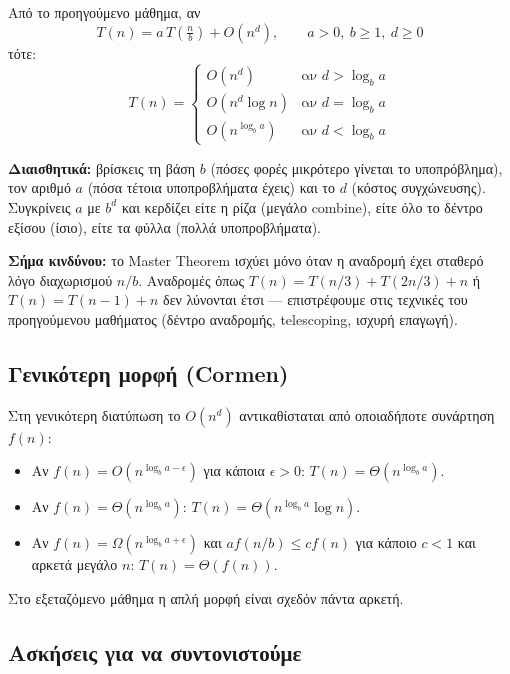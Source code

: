 \documentclass[11pt,a4paper]{article}
\begin{document}
Από το προηγούμενο μάθημα, αν
\[
T(n) = a \, T\!\left(\tfrac{n}{b}\right) + O(n^d), \qquad a > 0,\ b \ge 1,\ d
\ge 0
\]
τότε:
\[
T(n) = \begin{cases}
O(n^d)          & \text{αν } d > \log_b a \\
O(n^d \log n)   & \text{αν } d = \log_b a \\
O(n^{\log_b a}) & \text{αν } d < \log_b a
\end{cases}
\]

\textbf{Διαισθητικά:} βρίσκεις τη βάση $b$ (πόσες φορές μικρότερο γίνεται το
υποπρόβλημα), τον αριθμό $a$ (πόσα τέτοια υποπροβλήματα έχεις) και το $d$ (κόστος
συγχώνευσης). Συγκρίνεις $a$ με $b^d$ και κερδίζει είτε η ρίζα (μεγάλο combine),
είτε όλο το δέντρο εξίσου (ίσιο), είτε τα φύλλα (πολλά υποπροβλήματα).

\begin{intuition}
\textbf{Σήμα κινδύνου:} το Master Theorem ισχύει μόνο όταν η αναδρομή έχει
σταθερό λόγο διαχωρισμού $n/b$. Αναδρομές όπως $T(n) = T(n/3) + T(2n/3) + n$ ή
$T(n) = T(n-1) + n$ δεν λύνονται έτσι --- επιστρέφουμε στις τεχνικές του
προηγούμενου μαθήματος (δέντρο αναδρομής, telescoping, ισχυρή επαγωγή).
\end{intuition}

\subsection{Γενικότερη μορφή (Cormen)}

Στη γενικότερη διατύπωση το $O(n^d)$ αντικαθίσταται από οποιαδήποτε συνάρτηση
$f(n)$:
\begin{itemize}
  \item Αν $f(n) = O(n^{\log_b a - \epsilon})$ για κάποια $\epsilon > 0$:
  $T(n) = \Theta(n^{\log_b a})$.
  \item Αν $f(n) = \Theta(n^{\log_b a})$: $T(n) = \Theta(n^{\log_b a} \log n)$.
  \item Αν $f(n) = \Omega(n^{\log_b a + \epsilon})$ και $a f(n/b) \le c f(n)$ για
  κάποιο $c < 1$ και αρκετά μεγάλο $n$: $T(n) = \Theta(f(n))$.
\end{itemize}
Στο εξεταζόμενο μάθημα η απλή μορφή είναι σχεδόν πάντα αρκετή.

\subsection{Ασκήσεις για να συντονιστούμε}
\end{document}

